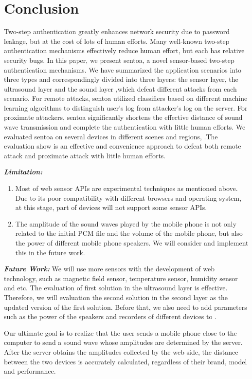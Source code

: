 \section{Conclusion}
Two-step authentication greatly enhances network security due to password leakage, but at the cost of lots of human efforts. Many well-known two-step authentication mechanisms effectively reduce human effort, but each has relative security bugs. In this paper, we present sentoa, a novel sensor-based two-step authentication mechanisms. We have summarized the application scenarios into three types and correspondingly divided \Name into three layers: the sensor layer, the ultrasound layer and the sound layer ,which defeat different attacks from each scenario. For remote attacks, sentoa utilized classifiers based on different machine learning algorithms to distinguish user's log from attacker's log on the server. For proximate attackers, sentoa significantly shortens the effective distance of sound wave transmission and complete the authentication with little human efforts. We evaluated sentoa on several devices in different scenes and regions, .The evaluation show \Name is an effective and convenience approach to defeat both remote attack and proximate attack with little human efforts.

\emph{\textbf{Limitation:}}
\begin{enumerate}
\item Most of web sensor APIs are experimental techniques as mentioned above. Due to its poor compatibility with different browsers and operating system, at this stage, part of devices will not support some sensor APIs.
\item The amplitude of the sound waves played by the mobile phone is not only related to the initial PCM file and the volume of the mobile phone, but also the power of different mobile phone speakers. We will consider and implement this in the future work.

\end{enumerate}



\emph{\textbf{Future Work:}} We will use more sensors with the development of web technology, such as magnetic field sensor, temperature sensor, humidity sensor and etc. The evaluation of first solution in the ultrasound layer is effective. Therefore, we will evaluation the second solution in the second layer as the updated version of the first solution. Before that, we also need to add parameters such as the power of the speakers and recorders of different devices to \name. 



Our ultimate goal is to realize that the user sends a mobile phone close to the computer to send a sound wave whose amplitudes are determined by the server. After the server obtains the amplitudes collected by the web side, the distance between the two devices is accurately calculated, regardless of their brand, model and performance.

\label{sec:conclusion}
